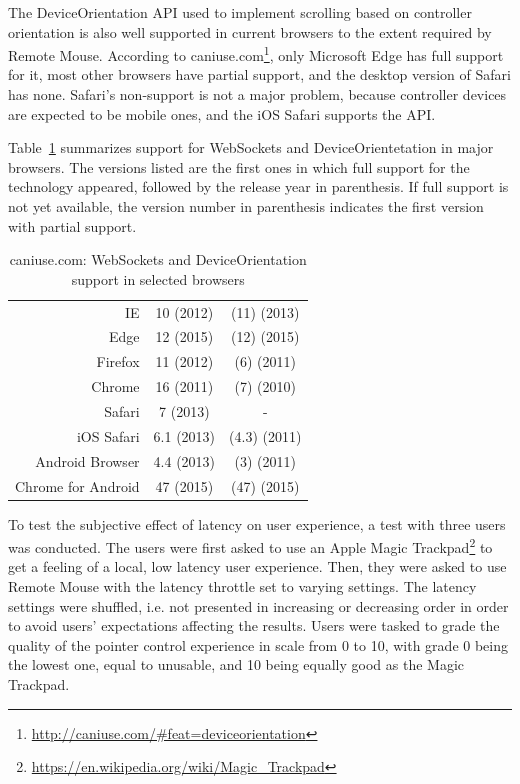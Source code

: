 \documentclass[a4paper,english,twocolumn]{article}
\newcommand*\rot{\rotatebox{90}}
\begin{document}
The DeviceOrientation API used to implement scrolling based on
controller orientation is also well supported in current browsers to
the extent required by Remote Mouse. According to
caniuse.com\footnote{\url{http://caniuse.com/#feat=deviceorientation}},
only Microsoft Edge has full support for it, most other browsers have
partial support, and the desktop version of Safari has none. Safari's
non-support is not a major problem, because controller devices are
expected to be mobile ones, and the iOS Safari supports the API.

Table~\ref{table:caniuse} summarizes support for WebSockets and
DeviceOrientetation in major browsers. The versions listed are the
first ones in which full support for the technology appeared, followed
by the release year in parenthesis. If full support is not yet
available, the version number in parenthesis indicates the first
version with partial support.

\begin{table} \centering
  \begin{tabular}{rcc}
    & \rot{WebSockets} & \rot{DeviceOrientation} \\
    \hline
    IE & 10 (2012) & (11) (2013) \\
    Edge & 12 (2015) & (12) (2015) \\
    Firefox & 11 (2012) & (6) (2011) \\
    Chrome & 16 (2011) & (7) (2010) \\
    Safari & 7 (2013) & - \\
    iOS Safari & 6.1 (2013) & (4.3) (2011) \\
    Android Browser & 4.4 (2013) & (3) (2011) \\
    Chrome for Android & 47 (2015) & (47) (2015) \\
    \hline
  \end{tabular}
  \caption{caniuse.com: WebSockets and DeviceOrientation support in selected browsers}
  \label{table:caniuse}
\end{table}

To test the subjective effect of latency on user experience, a test
with three users was conducted. The users were first asked to use an
Apple Magic
Trackpad\footnote{\url{https://en.wikipedia.org/wiki/Magic_Trackpad}}
to get a feeling of a local, low latency user experience. Then, they
were asked to use Remote Mouse with the latency throttle set to
varying settings. The latency settings were shuffled, i.e. not
presented in increasing or decreasing order in order to avoid users'
expectations affecting the results. Users were tasked to grade the
quality of the pointer control experience in scale from 0 to 10, with
grade 0 being the lowest one, equal to unusable, and 10 being equally
good as the Magic Trackpad.
\end{document}
